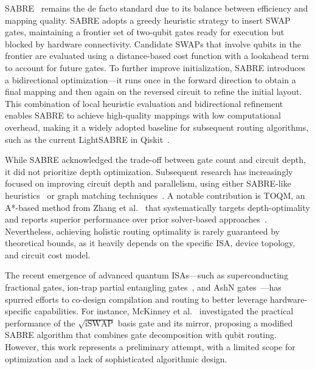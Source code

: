\documentclass[a4paper,onecolumn,11pt,unpublished]{quantumarticle}
\begin{document}
SABRE~\cite{Li2019Tackling} remains the de facto standard due to its balance between efficiency and mapping quality. SABRE adopts a greedy heuristic strategy to insert SWAP gates, maintaining a frontier set of two-qubit gates ready for execution but blocked by hardware connectivity. Candidate SWAPs that involve qubits in the frontier are evaluated using a distance-based cost function with a lookahead term to account for future gates. To further improve initialization, SABRE introduces a bidirectional optimization---it runs once in the forward direction to obtain a final mapping and then again on the reversed circuit to refine the initial layout. This combination of local heuristic evaluation and bidirectional refinement enables SABRE to achieve high-quality mappings with low computational overhead, making it a widely adopted baseline for subsequent routing algorithms, such as the current LightSABRE in Qiskit~\cite{Zou2024LightSABRE}.


While SABRE acknowledged the trade-off between gate count and circuit depth, it did not prioritize depth optimization. Subsequent research has increasingly focused on improving circuit depth and parallelism, using either SABRE-like heuristics~\cite{lao2022timing,ddroute2025,Zou2024LightSABRE} or graph matching techniques~\cite{childs2019circuit}. A notable contribution is TOQM, an A*-based method from Zhang et al.~\cite{Zhang2021Timeoptimal} that systematically targets depth-optimality and reports superior performance over prior solver-based approaches~\cite{Tan2020Optimal}. Nevertheless, achieving holistic routing optimality is rarely guaranteed by theoretical bounds, as it heavily depends on the specific ISA, device topology, and circuit cost model.


The recent emergence of advanced quantum ISAs---such as superconducting fractional gates, ion-trap partial entangling gates~\cite{yale2025realization}, and AshN gates~\cite{Chen2024One}---has spurred efforts to co-design compilation and routing to better leverage hardware-specific capabilities. For instance, McKinney et al.~\cite{mckinney2024mirage} investigated the practical performance of the $ \sqrt{\mathrm{iSWAP}} $ basis gate and its mirror, proposing a modified SABRE algorithm that combines gate decomposition with qubit routing. However, this work represents a preliminary attempt, with a limited scope for optimization and a lack of sophisticated algorithmic design.
\end{document}
